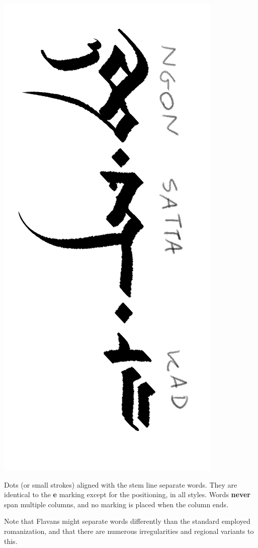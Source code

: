 \documentclass[10pt,oneside]{memoir}
\begin{document}
\begin{minipage}[]{0.45\textwidth}
    \centering
    \includegraphics{ngonsettakad}
\end{minipage}
\hfill
\begin{minipage}[]{0.5\textwidth}
    Dots (or small strokes) aligned with the stem line separate words. They are identical to the \textbf{e} marking except for the positioning, in all styles. Words \textbf{never} span multiple columns, and no marking is placed when the column ends.

    Note that Flavans might separate words differently than the standard employed romanization, and that there are numerous irregularities and regional variants to this.
\end{minipage}
\end{document}
